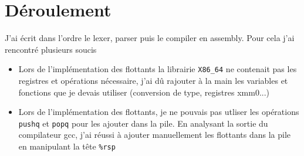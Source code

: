 \documentclass{report}
\begin{document}
\section{Déroulement}
J'ai écrit dans l'ordre le lexer, parser puis le compiler en assembly. Pour cela j'ai rencontré plusieurs soucis
\begin{itemize}
  \item Lors de l'implémentation des flottants la librairie \verb|X86_64| ne contenait pas les registres et opérations nécessaire, j'ai dû rajouter à la main les variables et fonctions que je devais utiliser (conversion de type, registres xmm0...)
  \item Lors de l'implémentation des flottants, je ne pouvais pas utliser les opérations \verb|pushq| et \verb|popq| pour les ajouter dans la pile. En analysant la sortie du compilateur gcc, j'ai réussi à ajouter manuellement les flottants dans la pile en manipulant la tête \verb|%rsp|
\end{itemize}
\end{document}
